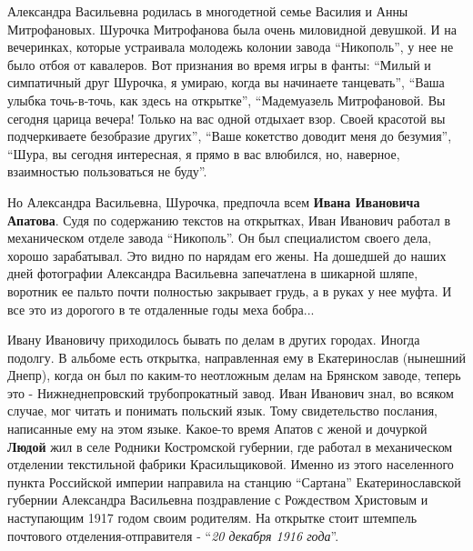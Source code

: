 Александра Васильевна родилась в многодетной семье Василия и Анны Митрофановых.
Шурочка Митрофанова была очень миловидной девушкой. И на вечеринках, которые
устраивала молодежь колонии завода \enquote{Никополь}, у нее не было отбоя от
кавалеров. Вот признания во время игры в фанты: \enquote{Милый и симпатичный друг
Шурочка, я умираю, когда вы начинаете танцевать}, \enquote{Ваша улыбка точь-в-точь, как
здесь на открытке}, \enquote{Мадемуазель Митрофановой. Вы сегодня царица вечера! Только
на вас одной отдыхает взор. Своей красотой вы подчеркиваете безобразие других},
\enquote{Ваше кокетство доводит меня до безумия}, \enquote{Шура, вы сегодня интересная, я прямо
в вас влюбился, но, наверное, взаимностью пользоваться не буду}.

Но Александра Васильевна, Шурочка, предпочла всем \textbf{Ивана Ивановича Апатова}. Судя
по содержанию текстов на открытках, Иван Иванович работал в механическом отделе
завода \enquote{Никополь}. Он был специалистом своего дела, хорошо зарабатывал. Это
видно по нарядам его жены. На дошедшей до наших дней фотографии Александра
Васильевна запечатлена в шикарной шляпе, воротник ее пальто почти полностью
закрывает грудь, а в руках у нее муфта. И все это из дорогого в те отдаленные
годы меха бобра...


Ивану Ивановичу приходилось бывать по делам в других городах. Иногда подолгу. В
альбоме есть открытка, направленная ему в Екатеринослав (нынешний Днепр), когда
он был по каким-то неотложным делам на Брянском заводе, теперь это -
Нижнеднепровский трубопрокатный завод. Иван Иванович знал, во всяком случае,
мог читать и понимать польский язык. Тому свидетельство послания, написанные
ему на этом языке. Какое-то время Апатов с женой и дочуркой \textbf{Людой} жил в селе
Родники Костромской губернии, где работал в механическом отделении текстильной
фабрики Красильщиковой. Именно из этого населенного пункта Российской империи
направила на станцию \enquote{Сартана} Екатеринославской губернии Александра Васильевна
поздравление с Рождеством Христовым и наступающим 1917 годом своим родителям.
На открытке стоит штемпель почтового отделения-отправителя - \enquote{\em 20 декабря 1916
года}.

